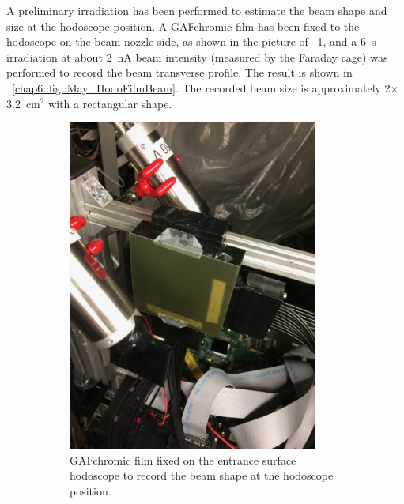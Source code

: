 A preliminary irradiation has been performed to estimate the beam shape and size at the hodoscope position. A GAFchromic film has been fixed to the hodoscope on the beam nozzle side, as shown in the picture of \figurename~\ref{chap6::fig::May_HodoFilm}, and a 6~s irradiation at about 2~nA beam intensity (measured by the Faraday cage) was performed to record the beam transverse profile. The result is shown in \figurename~\ref{chap6::fig::May_HodoFilmBeam}. The recorded beam size is approximately 2$\times$3.2~cm$^2$ with a rectangular shape. 

\begin{figure}
\begin{subfigure}[t]{.5\textwidth}
\centering
\includegraphics[width=0.9\textwidth]{03_GraphicFiles/chapter6_BeamTests/Nice_May2018/IMG_5170.jpg}
\caption{GAFchromic film fixed on the entrance surface hodoscope to record the beam shape at the hodoscope position.}
\label{chap6::fig::May_HodoFilm}
\end{subfigure}
\begin{subfigure}[t]{.5\textwidth}
\centering

\end{subfigure}
\end{figure}
